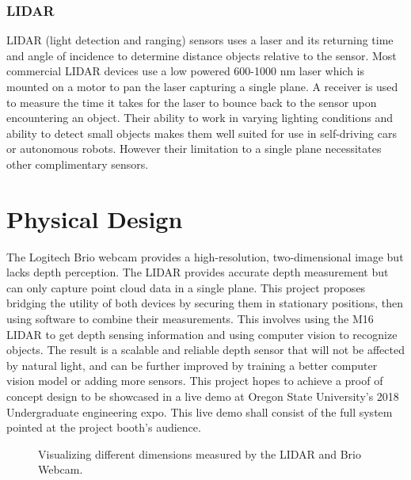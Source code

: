 \documentclass{article}
\begin{document}
    \subsubsection{LIDAR}
      LIDAR (light detection and ranging) sensors uses a laser and its returning time and angle of incidence to determine distance objects relative to the sensor. 
      Most commercial LIDAR devices use a low powered 600-1000 nm laser which is mounted on a motor to pan the laser capturing a single plane.
      A receiver is used to measure the time it takes for the laser to bounce back to the sensor upon encountering an object.
      Their ability to work in varying lighting conditions and ability to detect small objects makes them well suited for use in self-driving cars or autonomous robots. 
      However their limitation to a single plane necessitates other complimentary sensors.

\section{Physical Design}
\label{sec:PhysicalDesign}
  The Logitech Brio webcam provides a high-resolution, two-dimensional image but lacks depth perception.
  The LIDAR provides accurate depth measurement but can only capture point cloud data in a single plane.
  This project proposes bridging the utility of both devices by securing them in stationary positions, then using software to combine their measurements.
  This involves using the M16 LIDAR to get depth sensing information and using computer vision to recognize objects.
  The result is a scalable and reliable depth sensor that will not be affected by natural light, and can be further improved by training a better computer vision model or adding more sensors.
  This project hopes to achieve a proof of concept design to be showcased in a live demo at Oregon State University's 2018 Undergraduate engineering expo.			
  This live demo shall consist of the full system pointed at the project booth's audience. 

  \begin{figure}[h]
    \centering
    \caption{Visualizing different dimensions measured by the LIDAR and Brio Webcam.}
    \label{fig:differentDimensions}
  \end{figure}
\end{document}
